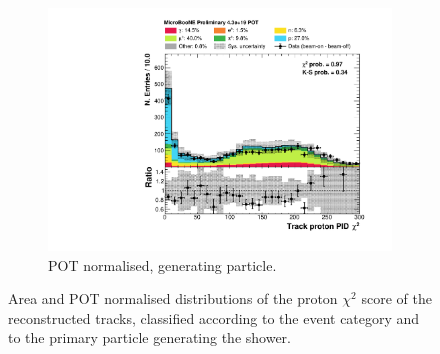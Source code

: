 \begin{figure}[htbp]
\begin{subfigure}{0.49\textwidth}
    \includegraphics[width=\linewidth]{figures/h_track_pidchipr_pdg.pdf}
    \caption{POT normalised, generating particle.} \label{fig:proton_pdg}
  \end{subfigure}
  \caption{Area and POT normalised distributions of the proton $\chi^2$ score of the reconstructed tracks, classified according to the event category and to the primary particle generating the shower.}
\end{figure}

